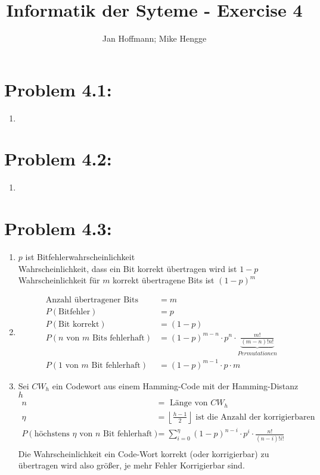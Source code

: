 \documentclass[10pt,a4paper]{article}
\title{Informatik der Syteme - Exercise 4}
\author{Jan Hoffmann; Mike Hengge}
\begin{document}
\section*{Problem 4.1:}
\begin{enumerate}
  \item
\end{enumerate}

\section*{Problem 4.2:}
\begin{enumerate}
	\item 
\end{enumerate}

\section*{Problem 4.3:}
\begin{enumerate}
	\item$p$ ist Bitfehlerwahrscheinlichkeit\\
		Wahrscheinlichkeit, dass ein Bit korrekt übertragen wird ist $1-p$\\
		Wahrscheinlichkeit für $m$ korrekt übertragene Bits ist $(1-p)^m$
	\item
		\begin{align*}
			\text{Anzahl übertragener Bits} &= m\\
			P(\text{Bitfehler}) &= p\\
			P(\text{Bit korrekt}) &= (1-p)\\
			P(n \text{ von } m \text{ Bits fehlerhaft}) &= (1 - p)^{m-n} \cdot p^n \cdot \underbrace{\frac{m!}{(m-n)!n!}}_{Permutationen} \\
			P(1\text{ von } m \text{ Bit fehlerhaft}) &= (1-p)^{m-1} \cdot p \cdot m
		\end{align*}
	\item
		Sei $CW_h$ ein Codewort aus einem Hamming-Code mit der Hamming-Distanz $h$\\		
		\begin{align*}	
			n &= \text{ Länge von }CW_h \\
			\eta &= \left\lfloor \frac{h-1}{2} \right\rfloor \text{ ist die Anzahl der korrigierbaren Fehler.} \\
			P(\text{höchstens } \eta \text{ von } n \text{ Bit fehlerhaft}) 
				&= \sum_{i=0}^{\eta}{(1 - p)^{n-i} \cdot p^i} \cdot \frac{n!}{(n-i)!i!}\\
		\end{align*}
		Die Wahrscheinlichkeit ein Code-Wort korrekt (oder korrigierbar) zu übertragen wird also größer, je mehr Fehler Korrigierbar sind.	
\end{enumerate}
\end{document}
